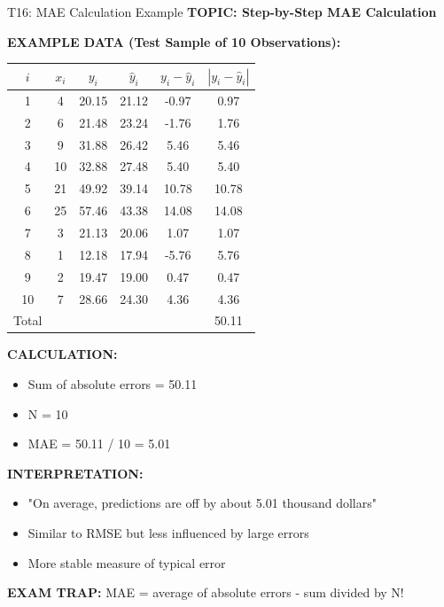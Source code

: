 \documentclass[8pt]{beamer}
\begin{document}
	
	\begin{frame}{T16: MAE Calculation Example}
		\fontsize{6.5}{7.5}\selectfont
		\textbf{TOPIC: Step-by-Step MAE Calculation}
		
		\vspace{0.1cm}
		\textbf{EXAMPLE DATA (Test Sample of 10 Observations):}
		
		\begin{tabular}{|c|c|c|c|c|c|}
			\hline
			$i$ & $x_i$ & $y_i$ & $\hat{y}_i$ & $y_i - \hat{y}_i$ & $|y_i - \hat{y}_i|$ \\
			\hline
			1 & 4 & 20.15 & 21.12 & -0.97 & 0.97 \\
			2 & 6 & 21.48 & 23.24 & -1.76 & 1.76 \\
			3 & 9 & 31.88 & 26.42 & 5.46 & 5.46 \\
			4 & 10 & 32.88 & 27.48 & 5.40 & 5.40 \\
			5 & 21 & 49.92 & 39.14 & 10.78 & 10.78 \\
			6 & 25 & 57.46 & 43.38 & 14.08 & 14.08 \\
			7 & 3 & 21.13 & 20.06 & 1.07 & 1.07 \\
			8 & 1 & 12.18 & 17.94 & -5.76 & 5.76 \\
			9 & 2 & 19.47 & 19.00 & 0.47 & 0.47 \\
			10 & 7 & 28.66 & 24.30 & 4.36 & 4.36 \\
			\hline
			Total & & & & & 50.11 \\
			\hline
		\end{tabular}
		
		\vspace{0.1cm}
		\textbf{CALCULATION:}
		\begin{itemize}
			\item Sum of absolute errors = 50.11
			\item N = 10
			\item MAE = 50.11 / 10 = 5.01
		\end{itemize}
		
		\vspace{0.1cm}
		\textbf{INTERPRETATION:}
		\begin{itemize}
			\item "On average, predictions are off by about 5.01 thousand dollars"
			\item Similar to RMSE but less influenced by large errors
			\item More stable measure of typical error
		\end{itemize}
		
		\textcolor{myred}{\textbf{EXAM TRAP:}} MAE = \textcolor{myblue}{average of absolute errors} - sum divided by N!
	\end{frame}
	
\end{document}
